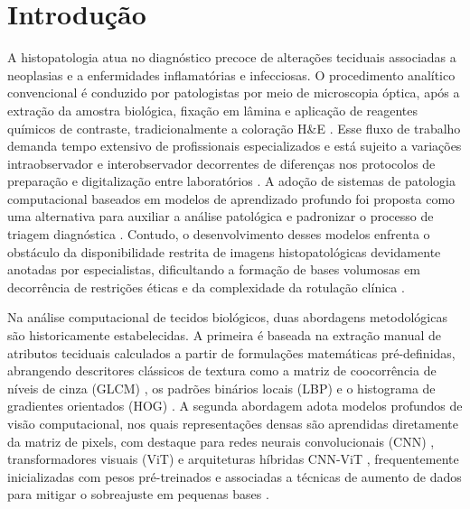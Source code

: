 \chapter{Introdução}

A histopatologia atua no diagnóstico precoce de alterações teciduais associadas a neoplasias e a enfermidades inflamatórias e infecciosas. O procedimento analítico convencional é conduzido por patologistas por meio de microscopia óptica, após a extração da amostra biológica, fixação em lâmina e aplicação de reagentes químicos de contraste, tradicionalmente a coloração H\&E \cite{srinidhi2021deep}. Esse fluxo de trabalho demanda tempo extensivo de profissionais especializados e está sujeito a variações intraobservador e interobservador decorrentes de diferenças nos protocolos de preparação e digitalização entre laboratórios \cite{histImgColorectal}. A adoção de sistemas de patologia computacional baseados em modelos de aprendizado profundo foi proposta como uma alternativa para auxiliar a análise patológica e padronizar o processo de triagem diagnóstica \cite{litjens2017survey,bejnordi2017diagnostic}. Contudo, o desenvolvimento desses modelos enfrenta o obstáculo da disponibilidade restrita de imagens histopatológicas devidamente anotadas por especialistas, dificultando a formação de bases volumosas em decorrência de restrições éticas e da complexidade da rotulação clínica \cite{histImgColorectal,clinicalReview}.

Na análise computacional de tecidos biológicos, duas abordagens metodológicas são historicamente estabelecidas. A primeira é baseada na extração manual de atributos teciduais calculados a partir de formulações matemáticas pré-definidas, abrangendo descritores clássicos de textura como a matriz de coocorrência de níveis de cinza (GLCM) \cite{haralick1973textural}, os padrões binários locais (LBP) \cite{ojala2002multiresolution} e o histograma de gradientes orientados (HOG) \cite{dalal2005histograms}. A segunda abordagem adota modelos profundos de visão computacional, nos quais representações densas são aprendidas diretamente da matriz de pixels, com destaque para redes neurais convolucionais (CNN) \cite{he2016deep}, transformadores visuais (ViT) \cite{dosovitskiy2020image} e arquiteturas híbridas CNN-ViT \cite{mehta2022mobilevit,dai2021coatnet}, frequentemente inicializadas com pesos pré-treinados e associadas a técnicas de aumento de dados para mitigar o sobreajuste em pequenas bases \cite{autoHistImg,shorten2019survey}.

